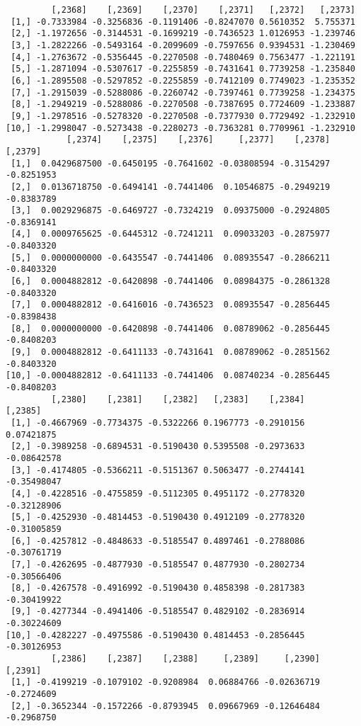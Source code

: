 \documentclass[
  letterpaper,
  DIV=11,
  numbers=noendperiod]{scrreprt}
\begin{document}
\begin{verbatim}
         [,2368]    [,2369]    [,2370]    [,2371]   [,2372]   [,2373]
 [1,] -0.7333984 -0.3256836 -0.1191406 -0.8247070 0.5610352  5.755371
 [2,] -1.1972656 -0.3144531 -0.1699219 -0.7436523 1.0126953 -1.239746
 [3,] -1.2822266 -0.5493164 -0.2099609 -0.7597656 0.9394531 -1.230469
 [4,] -1.2763672 -0.5356445 -0.2270508 -0.7480469 0.7563477 -1.221191
 [5,] -1.2871094 -0.5307617 -0.2255859 -0.7431641 0.7739258 -1.235840
 [6,] -1.2895508 -0.5297852 -0.2255859 -0.7412109 0.7749023 -1.235352
 [7,] -1.2915039 -0.5288086 -0.2260742 -0.7397461 0.7739258 -1.234375
 [8,] -1.2949219 -0.5288086 -0.2270508 -0.7387695 0.7724609 -1.233887
 [9,] -1.2978516 -0.5278320 -0.2270508 -0.7377930 0.7729492 -1.232910
[10,] -1.2998047 -0.5273438 -0.2280273 -0.7363281 0.7709961 -1.232910
            [,2374]    [,2375]    [,2376]     [,2377]    [,2378]    [,2379]
 [1,]  0.0429687500 -0.6450195 -0.7641602 -0.03808594 -0.3154297 -0.8251953
 [2,]  0.0136718750 -0.6494141 -0.7441406  0.10546875 -0.2949219 -0.8383789
 [3,]  0.0029296875 -0.6469727 -0.7324219  0.09375000 -0.2924805 -0.8369141
 [4,]  0.0009765625 -0.6445312 -0.7241211  0.09033203 -0.2875977 -0.8403320
 [5,]  0.0000000000 -0.6435547 -0.7441406  0.08935547 -0.2866211 -0.8403320
 [6,]  0.0004882812 -0.6420898 -0.7441406  0.08984375 -0.2861328 -0.8403320
 [7,]  0.0004882812 -0.6416016 -0.7436523  0.08935547 -0.2856445 -0.8398438
 [8,]  0.0000000000 -0.6420898 -0.7441406  0.08789062 -0.2856445 -0.8408203
 [9,]  0.0004882812 -0.6411133 -0.7431641  0.08789062 -0.2851562 -0.8403320
[10,] -0.0004882812 -0.6411133 -0.7441406  0.08740234 -0.2856445 -0.8408203
         [,2380]    [,2381]    [,2382]   [,2383]    [,2384]     [,2385]
 [1,] -0.4667969 -0.7734375 -0.5322266 0.1967773 -0.2910156  0.07421875
 [2,] -0.3989258 -0.6894531 -0.5190430 0.5395508 -0.2973633 -0.08642578
 [3,] -0.4174805 -0.5366211 -0.5151367 0.5063477 -0.2744141 -0.35498047
 [4,] -0.4228516 -0.4755859 -0.5112305 0.4951172 -0.2778320 -0.32128906
 [5,] -0.4252930 -0.4814453 -0.5190430 0.4912109 -0.2778320 -0.31005859
 [6,] -0.4257812 -0.4848633 -0.5185547 0.4897461 -0.2788086 -0.30761719
 [7,] -0.4262695 -0.4877930 -0.5185547 0.4877930 -0.2802734 -0.30566406
 [8,] -0.4267578 -0.4916992 -0.5190430 0.4858398 -0.2817383 -0.30419922
 [9,] -0.4277344 -0.4941406 -0.5185547 0.4829102 -0.2836914 -0.30224609
[10,] -0.4282227 -0.4975586 -0.5190430 0.4814453 -0.2856445 -0.30126953
         [,2386]    [,2387]    [,2388]     [,2389]     [,2390]    [,2391]
 [1,] -0.4199219 -0.1079102 -0.9208984  0.06884766 -0.02636719 -0.2724609
 [2,] -0.3652344 -0.1572266 -0.8793945  0.09667969 -0.12646484 -0.2968750

\end{verbatim}
\end{document}
